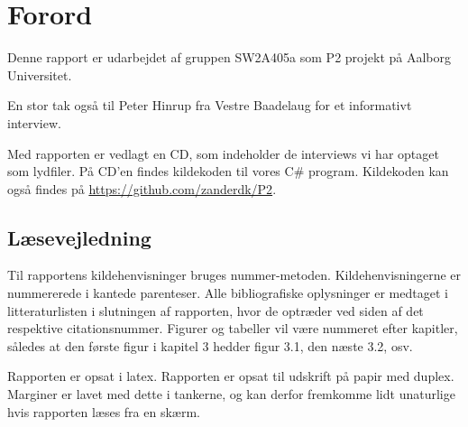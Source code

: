 \chapter*{Forord}
Denne rapport er udarbejdet af gruppen SW2A405a som P2 projekt på Aalborg Universitet.


En stor tak også til Peter Hinrup fra Vestre Baadelaug for et informativt interview.

Med rapporten er vedlagt en CD, som indeholder de interviews vi har optaget som lydfiler. På CD'en findes kildekoden til vores C\# program. Kildekoden kan også findes på \url{https://github.com/zanderdk/P2}.


\section{Læsevejledning}
Til rapportens kildehenvisninger bruges nummer-metoden. Kildehenvisningerne er nummererede i kantede parenteser. Alle bibliografiske oplysninger er medtaget i litteraturlisten i slutningen af rapporten, hvor de optræder ved siden af det respektive citationsnummer. Figurer og tabeller vil være nummeret efter kapitler, således at den første figur i kapitel 3 hedder figur 3.1, den næste 3.2, osv.	

Rapporten er opsat i latex. Rapporten er opsat til udskrift på papir med duplex. Marginer er lavet med dette i tankerne, og kan derfor fremkomme lidt unaturlige hvis rapporten læses fra en skærm.
